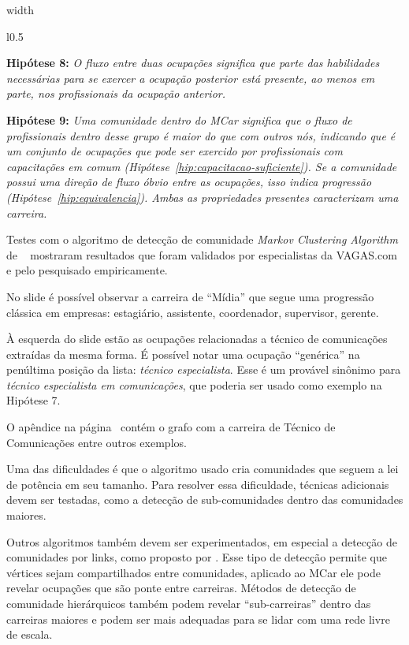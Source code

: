 \documentclass[10pt,a4paper,final]{article}
\newcommand\disappearingrule{%
  \par %
  \vskip10pt %
  \leaders\vrule width \textwidth\vskip0.4pt %
  \nointerlineskip %
  \vskip10pt %
}
\newenvironment{slidelong}[1]
{
  \disappearingrule
  
  \begin{minipage}[t]{\linewidth}
    \setlength{\parskip}{1ex}
    \begin{wrapfigure}{l}{0.5\textwidth}
      \includeslide[width=0.48\textwidth]{#1}%
      \vspace{-0.8cm}
      \label{sde:#1}
    \end{wrapfigure}}
    {\end{minipage}}
\begin{document}
\begin{slidelong}{hipotese-carreira}
  \textbf{Hipótese 8:} \textit{ O fluxo entre duas ocupações significa que parte das habilidades necessárias para se exercer a ocupação posterior está presente, ao menos em parte, nos profissionais da ocupação anterior.}
  
  \textbf{Hipótese 9:} \textit{Uma comunidade dentro do MCar significa que o fluxo de profissionais dentro desse grupo é maior do que com outros nós, indicando que é um conjunto de ocupações que pode ser exercido por profissionais com capacitações em comum (Hipótese~\ref{hip:capacitacao-suficiente}). Se a comunidade possui uma direção de fluxo óbvio entre as ocupações, isso indica progressão (Hipótese~\ref{hip:equivalencia}). Ambas as propriedades presentes caracterizam uma carreira.}
  
  Testes com o algoritmo de detecção de comunidade \textit{Markov Clustering Algorithm} de ~ mostraram resultados que foram validados por especialistas da VAGAS.com e pelo pesquisado empiricamente.
  
  No slide é possível observar a carreira de \enquote{Mídia} que segue uma progressão clássica em empresas: estagiário, assistente, coordenador, supervisor, gerente.
  
  À esquerda do slide estão as ocupações relacionadas a técnico de comunicações extraídas da mesma forma. É possível notar uma ocupação \enquote{genérica} na penúltima posição da lista: \textit{técnico especialista}. Esse é um provável sinônimo para \textit{técnico especialista em comunicações}, que poderia ser usado como exemplo na Hipótese 7.
  
  O apêndice na página~\pageref{apx:exemplo-de-carreiras} contém o grafo com a carreira de Técnico de Comunicações entre outros exemplos.
  
  Uma das dificuldades é que o algoritmo usado cria comunidades que seguem a lei de potência em seu tamanho. Para resolver essa dificuldade, técnicas adicionais devem ser testadas, como a detecção de sub-comunidades dentro das comunidades maiores. 
  
  Outros algoritmos também devem ser experimentados, em especial a detecção de comunidades por links, como proposto por . Esse tipo de detecção permite que vértices sejam compartilhados entre comunidades, aplicado ao MCar ele pode revelar ocupações que são ponte entre carreiras. Métodos de detecção de comunidade hierárquicos também podem revelar \enquote{sub-carreiras} dentro das carreiras maiores e podem ser mais adequadas para se lidar com uma rede livre de escala.
\end{slidelong}
\end{document}
